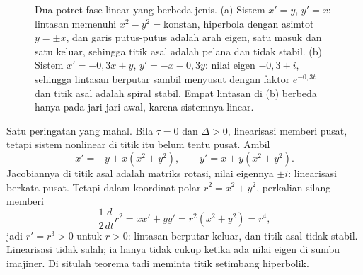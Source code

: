 \begin{figure}[htbp]
\centering
{}
\caption{Dua potret fase linear yang berbeda jenis. (a) Sistem
$x'=y$, $y'=x$: lintasan memenuhi $x^{2}-y^{2}=\text{konstan}$, hiperbola
dengan asimtot $y=\pm x$, dan garis putus-putus adalah arah eigen, satu masuk
dan satu keluar, sehingga titik asal adalah pelana dan tidak stabil. (b) Sistem $x'=-0{,}3x+y$, $y'=-x-0{,}3y$:
nilai eigen $-0{,}3\pm i$, sehingga lintasan berputar sambil menyusut dengan
faktor $e^{-0{,}3t}$ dan titik asal adalah spiral stabil. Empat lintasan di (b)
berbeda hanya pada jari-jari awal, karena sistemnya linear.}
\label{fig:potret-linear}
\end{figure}

Satu peringatan yang mahal. Bila $\tau=0$ dan $\Delta>0$, linearisasi memberi
pusat, tetapi sistem nonlinear di titik itu belum tentu pusat. Ambil
\[
x'=-y+x(x^{2}+y^{2}),\qquad y'=x+y(x^{2}+y^{2}).
\]
Jacobiannya di titik asal adalah matriks rotasi, nilai eigennya $\pm i$:
linearisasi berkata pusat. Tetapi dalam koordinat polar $r^{2}=x^{2}+y^{2}$,
perkalian silang memberi
\[
\frac{1}{2}\frac{d}{dt}r^{2}=xx'+yy'=r^{2}(x^{2}+y^{2})=r^{4},
\]
jadi $r'=r^{3}>0$ untuk $r>0$: lintasan berputar keluar, dan titik asal tidak
stabil. Linearisasi tidak salah; ia hanya tidak cukup ketika ada nilai eigen di
sumbu imajiner. Di situlah teorema tadi meminta titik setimbang hiperbolik.

